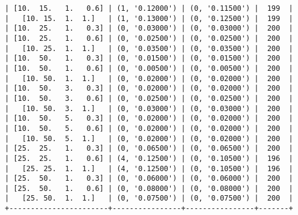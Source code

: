 \documentclass{article}
\begin{document}
\begin{verbatim}
| [10.  15.   1.   0.6] | (1, '0.12000') | (0, '0.11500') |  199  |
|   [10. 15.  1.  1.]   | (1, '0.13000') | (0, '0.12500') |  199  |
| [10.  25.   1.   0.3] | (0, '0.03000') | (0, '0.03000') |  200  |
| [10.  25.   1.   0.6] | (0, '0.02500') | (0, '0.02500') |  200  |
|   [10. 25.  1.  1.]   | (0, '0.03500') | (0, '0.03500') |  200  |
| [10.  50.   1.   0.3] | (0, '0.01500') | (0, '0.01500') |  200  |
| [10.  50.   1.   0.6] | (0, '0.00500') | (0, '0.00500') |  200  |
|   [10. 50.  1.  1.]   | (0, '0.02000') | (0, '0.02000') |  200  |
| [10.  50.   3.   0.3] | (0, '0.02000') | (0, '0.02000') |  200  |
| [10.  50.   3.   0.6] | (0, '0.02500') | (0, '0.02500') |  200  |
|   [10. 50.  3.  1.]   | (0, '0.03000') | (0, '0.03000') |  200  |
| [10.  50.   5.   0.3] | (0, '0.02000') | (0, '0.02000') |  200  |
| [10.  50.   5.   0.6] | (0, '0.02000') | (0, '0.02000') |  200  |
|   [10. 50.  5.  1.]   | (0, '0.02000') | (0, '0.02000') |  200  |
| [25.  25.   1.   0.3] | (0, '0.06500') | (0, '0.06500') |  200  |
| [25.  25.   1.   0.6] | (4, '0.12500') | (0, '0.10500') |  196  |
|   [25. 25.  1.  1.]   | (4, '0.12500') | (0, '0.10500') |  196  |
| [25.  50.   1.   0.3] | (0, '0.06000') | (0, '0.06000') |  200  |
| [25.  50.   1.   0.6] | (0, '0.08000') | (0, '0.08000') |  200  |
|   [25. 50.  1.  1.]   | (0, '0.07500') | (0, '0.07500') |  200  |
+-----------------------+----------------+----------------+-------+
\end{verbatim}
\end{document}
